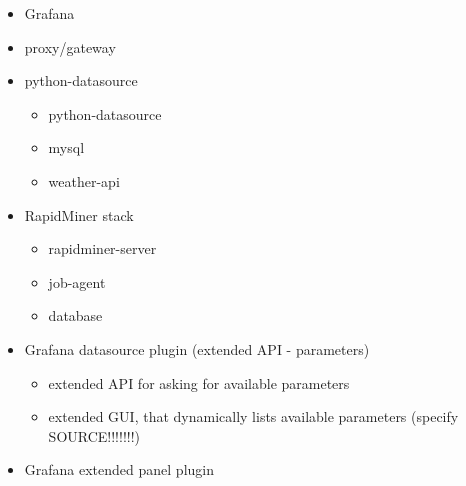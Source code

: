 \begin{itemize}
	\item Grafana
	\item proxy/gateway
	\item python-datasource
	\begin{itemize}
		\item python-datasource
		\item mysql
		\item weather-api
	\end{itemize}
	\item RapidMiner stack
	\begin{itemize}
		\item rapidminer-server
		\item job-agent
		\item database
	\end{itemize}
	\item Grafana datasource plugin (extended API - parameters)
	\begin{itemize}
		\item extended API for asking for available parameters
		\item extended GUI, that dynamically lists available parameters (specify SOURCE!!!!!!!)
	\end{itemize}
	\item Grafana extended panel plugin
\end{itemize}